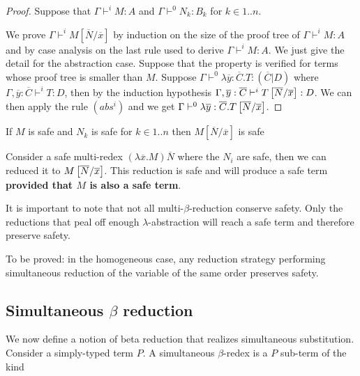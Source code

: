 \begin{proof}
Suppose that $\Gamma \vdash^i M : A$ and  $\Gamma \vdash^0 N_k : B_k$ for $k \in 1..n$.

We prove $\Gamma \vdash^i M[\overline{N}/\overline{x}]$ by induction on the size of the proof
tree of $\Gamma \vdash^i M : A$ and by case analysis on the last rule used to derive $\Gamma \vdash^i M : A$.
We just give the detail for the abstraction case. Suppose that the property is verified for terms whose proof tree is
smaller than $M$. Suppose $\Gamma \vdash^0 \lambda \overline{y} : \overline{C}. T : (\overline{C}|D)$ where
$\Gamma, \overline{y}:\overline{C} \vdash^i T : D$, then
by the induction hypothesis $\Gamma, \overline{y}:\overline{C} \vdash^i T\left[ \overline{N}/\overline{x} \right] : D$.
We can then apply the rule $(abs^i)$ and we get
$\Gamma \vdash^0 \lambda \overline{y}:\overline{C} . T \left[ \overline{N}/\overline{x} \right]$.
\end{proof}


\begin{cor}
\label{cor:subst_preserve_safety}
If $M$ is safe and $N_k$ is safe for $k \in 1..n$ then  $M[\overline{N}/\overline{x}]$ is safe
\end{cor}

\begin{cor}
Consider a safe multi-redex $(\lambda \overline{x} . M ) \overline{N}$ where the $N_i$ are safe, then
we can reduced it to $M\left[ \overline{N}/\overline{x} \right]$. This reduction is safe and will produce
a safe term \textbf{provided that $M$ is also a safe term}.
\end{cor}


It is important to note that not all multi-$\beta$-reduction conserve safety. Only the reductions that
peal off enough $\lambda$-abstraction will reach a safe term and therefore preserve safety.


\todo To be proved: in the homogeneous case, any reduction
strategy performing simultaneous reduction of the variable of the same order
preserves safety.


\subsection{Simultaneous $\beta$ reduction}

We now define a notion of beta reduction that realizes simultaneous
substitution. Consider a simply-typed term $P$. A simultaneous
$\beta$-redex is a $P$ sub-term of the kind

